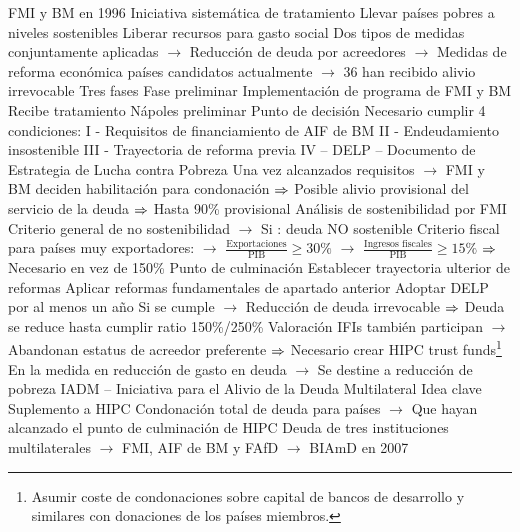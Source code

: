 \documentclass{nuevotema}
\begin{document}
\begin{esquemal}
				\4[] FMI y BM en 1996
				\4[] Iniciativa sistemática de tratamiento
				\4[] Llevar países pobres a niveles sostenibles
				\4[] Liberar recursos para gasto social
				\4[] Dos tipos de medidas conjuntamente aplicadas
				\4[] $\to$ Reducción de deuda por acreedores
				\4[] $\to$ Medidas de reforma económica
				 países candidatos actualmente
				\4[] $\to$ 36 han recibido alivio irrevocable
				\4[] Tres fases
				\4[Etapa 0] Fase preliminar
				\4[] Implementación de programa de FMI y BM
				\4[] Recibe tratamiento Nápoles preliminar
				\4[Etapa I] Punto de decisión
				\4[] Necesario cumplir 4 condiciones:
				\4[] I - Requisitos de financiamiento de AIF de BM
				\4[] II - Endeudamiento insostenible
				\4[] III - Trayectoria de reforma previa
				\4[] IV -- DELP -- Documento de Estrategia de Lucha contra Pobreza
				\4[] Una vez alcanzados requisitos
				\4[] $\to$ FMI y BM deciden habilitación para condonación
				\4[] $\Rightarrow$ Posible alivio provisional del servicio de la deuda
				\4[] $\Rightarrow$ Hasta 90\% provisional
				\4[] Análisis de sostenibilidad por FMI
				\4[] Criterio general de no sostenibilidad
				\4[] $\to$ Si : deuda NO sostenible
				\4[] Criterio fiscal para países muy exportadores:
				\4[] $\to$ $\frac{\text{Exportaciones}}{\text{PIB}} \geq 30\%$
				\4[] $\to$ $\frac{\text{Ingresos fiscales}}{\text{PIB}} \geq 15\%$
				\4[] $\Rightarrow$ Necesario  en vez de 150\%
				\4[Etapa II] Punto de culminación
				\4[] Establecer trayectoria ulterior de reformas
				\4[] Aplicar reformas fundamentales de apartado anterior
				\4[] Adoptar DELP por al menos un año
				\4[] Si se cumple
				\4[] $\to$ Reducción de deuda irrevocable
				\4[] $\Rightarrow$ Deuda se reduce hasta cumplir ratio 150\%/250\%
				\4 Valoración
				\4[] IFIs también participan
				\4[] $\to$ Abandonan estatus de acreedor preferente
				\4[] $\Rightarrow$ Necesario crear HIPC trust funds\footnote{Asumir coste de condonaciones sobre capital de bancos de desarrollo y similares con donaciones de los países miembros.}
				\4[] En la medida en reducción de gasto en deuda
				\4[] $\to$ Se destine a reducción de pobreza
			\3 IADM -- Iniciativa para el Alivio de la Deuda Multilateral
				\4 Idea clave
				\4[] Suplemento a HIPC
				\4[] Condonación total de deuda para países
				\4[] $\to$ Que hayan alcanzado el punto de culminación de HIPC
				\4[] Deuda de tres instituciones multilaterales
				\4[] $\to$ FMI, AIF de BM y FAfD
				\4[] $\to$ BIAmD en 2007

\end{esquemal}
\end{document}
